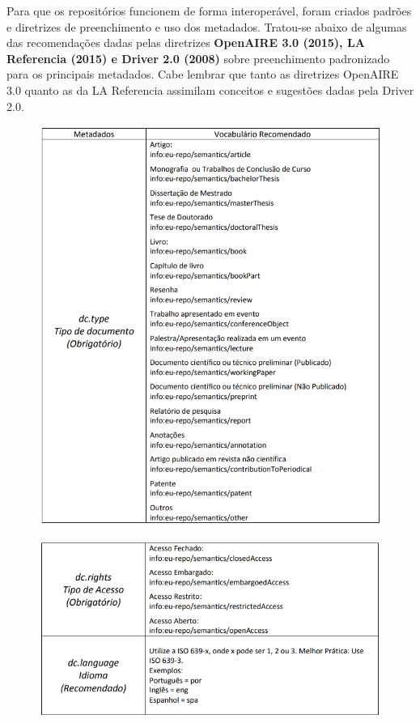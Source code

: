 \documentclass[12pt,hidelinks]{article}
\begin{document}
    Para que os repositórios funcionem de forma interoperável, foram criados padrões e diretrizes de preenchimento e uso dos metadados. Tratou-se abaixo de algumas das recomendações dadas pelas diretrizes \textbf{OpenAIRE 3.0 (2015), LA Referencia (2015) e Driver 2.0 (2008)} sobre preenchimento padronizado para os principais metadados. Cabe lembrar que tanto as diretrizes OpenAIRE 3.0 quanto as da LA Referencia assimilam conceitos e sugestões dadas pela Driver 2.0.
    
    \begin{figure}[!htp]
                \centering
                \includegraphics[scale=0.9]{figura/OpenAIRE.png}
            \label{Rotulo}
        \end{figure}
    
    \begin{figure}[!htp]
                \centering
                \includegraphics[scale=0.9]{figura/OpenAIRE2.png}
            \label{Rotulo}
        \end{figure}
        
\end{document}

